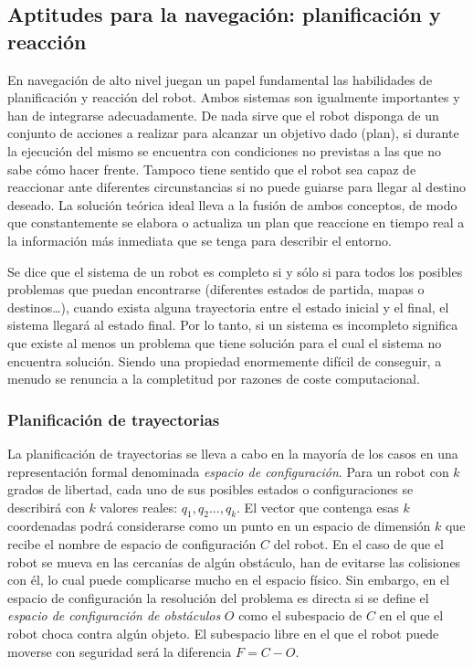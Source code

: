 \subsection{Aptitudes para la navegación: planificación y reacción}
En navegación de alto nivel juegan un papel fundamental las habilidades de planificación y reacción del robot. Ambos sistemas son igualmente importantes y han de integrarse adecuadamente. De nada sirve que el robot disponga de un conjunto de acciones a realizar para alcanzar un objetivo dado (plan), si durante la ejecución del mismo se encuentra con condiciones no previstas a las que no sabe cómo hacer frente. Tampoco tiene sentido que el robot sea capaz de reaccionar ante diferentes circunstancias si no puede guiarse para llegar al destino deseado. La solución teórica ideal lleva a la fusión de ambos conceptos, de modo que constantemente se elabora o actualiza un plan que reaccione en tiempo real a la información más inmediata que se tenga para describir el entorno.

Se dice que el sistema de un robot es completo si y sólo si para todos los posibles problemas que puedan encontrarse (diferentes estados de partida, mapas o destinos\ldots), cuando exista alguna trayectoria entre el estado inicial y el final, el sistema llegará al estado final. Por lo tanto, si un sistema es incompleto significa que existe al menos un problema que tiene solución para el cual el sistema no encuentra solución. Siendo una propiedad enormemente difícil de conseguir, a menudo se renuncia a la completitud por razones de coste computacional.

\subsubsection{Planificación de trayectorias}
La planificación de trayectorias se lleva a cabo en la mayoría de los casos en una representación formal denominada \emph{espacio de configuración}. Para un robot con $k$ grados de libertad, cada uno de sus posibles estados o configuraciones se describirá con $k$ valores reales: $q_{1},q_{2}...,q_{k}$. El vector que contenga esas $k$ coordenadas podrá considerarse como un punto en un espacio de dimensión $k$ que recibe el nombre de espacio de configuración $C$ del robot. En el caso de que el robot se mueva en las cercanías de algún obstáculo, han de evitarse las colisiones con él, lo cual puede complicarse mucho en el espacio físico. Sin embargo, en el espacio de configuración la resolución del problema es directa si se define el \emph{espacio de configuración de obstáculos} $O$ como el subespacio de $C$ en el que el robot choca contra algún objeto. El subespacio libre en el que el robot puede moverse con seguridad será la diferencia $F = C-O$.

